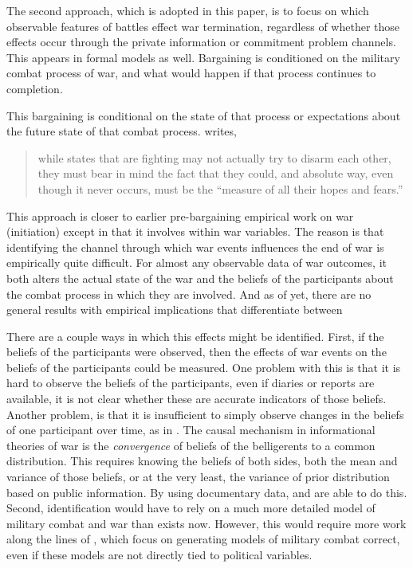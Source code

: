 The second approach, which is adopted in this paper, is to focus on which observable features of battles effect war termination, regardless of whether those effects occur through the private information or commitment problem channels. This appears in formal models as well. %
Bargaining is conditioned on the military combat process of war, and what would happen if that process continues to completion.

This bargaining is conditional on the state of that process or
expectations about the future state of that combat process.
\textcite[135]{Wagner2000} writes,
\begin{quotation}
  while states that are fighting may not actually try to disarm each
  other, they must bear in mind the fact that they could, and absolute
  way, even though it never occurs, must be the ``measure of all their
  hopes and fears.''
\end{quotation}

This approach is closer to earlier pre-bargaining empirical work on war (initiation) except in that it involves within war variables. %
The reason is that identifying the channel through which war events influences the end of war is empirically quite difficult. %
For almost any observable data of war outcomes, it both alters the actual state of the war and the beliefs of the participants about the combat process in which they are involved. %
And as of yet, there are no general results with empirical implications that differentiate between

There are a couple ways in which this effects might be identified. %
First, if the beliefs of the participants were observed, then the effects of war events on the beliefs of the participants could be measured. %
One problem with this is that it is hard to observe the beliefs of the participants, even if diaries or reports are available, it is not clear whether these are accurate indicators of those beliefs. %
Another problem, is that it is insufficient to simply observe changes in the beliefs of one participant over time, as in \textcite{Reiter2009}. %
The causal mechanism in informational theories of war is the \textit{convergence} of beliefs of the belligerents to a common distribution. %
This requires knowing the beliefs of both sides, both the mean and variance of those beliefs, or at the very least, the variance of prior distribution based on public information. %
By using documentary data, \textcite{Goemans2000} and \textcite{Reiter2009} are able to do this.
Second, identification would have to rely on a much more detailed model of military combat and war than exists now.
However, this would require more work along the lines of \textcite{Biddle2004}, which focus on generating models of military combat correct, even if these models are not directly tied to political variables.

